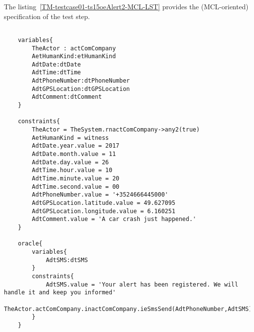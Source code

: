 	
	
		
	\vspace{1cm}
	The listing~\ref{TM-testcase01-ts15oeAlert2-MCL-LST} provides the \msrmessir (MCL-oriented) specification of the test step.
	
	\scriptsize
	\vspace{0.5cm}
	\begin{lstlisting}[style=MessirStyle,firstnumber=auto,captionpos=b,caption={\msrmessir (MCL-oriented) specification of the test step \emph{testcase01-ts15oeAlert2}.},label=TM-testcase01-ts15oeAlert2-MCL-LST]

	variables{
		TheActor : actComCompany
		AetHumanKind:etHumanKind
		AdtDate:dtDate
		AdtTime:dtTime
		AdtPhoneNumber:dtPhoneNumber
		AdtGPSLocation:dtGPSLocation
		AdtComment:dtComment
	}
	
	constraints{
		TheActor = TheSystem.rnactComCompany->any2(true)
		AetHumanKind = witness
		AdtDate.year.value = 2017
		AdtDate.month.value = 11
		AdtDate.day.value = 26
		AdtTime.hour.value = 10
		AdtTime.minute.value = 20
		AdtTime.second.value = 00
		AdtPhoneNumber.value = '+3524666445000'
		AdtGPSLocation.latitude.value = 49.627095
		AdtGPSLocation.longitude.value = 6.160251
		AdtComment.value = 'A car crash just happened.'
	}
	
	oracle{
		variables{
			AdtSMS:dtSMS
		}
		constraints{
			AdtSMS.value = 'Your alert has been registered. We will handle it and keep you informed'
			TheActor.actComCompany.inactComCompany.ieSmsSend(AdtPhoneNumber,AdtSMS)
		}
	}
	
	\end{lstlisting}
	\normalsize 
	
	
